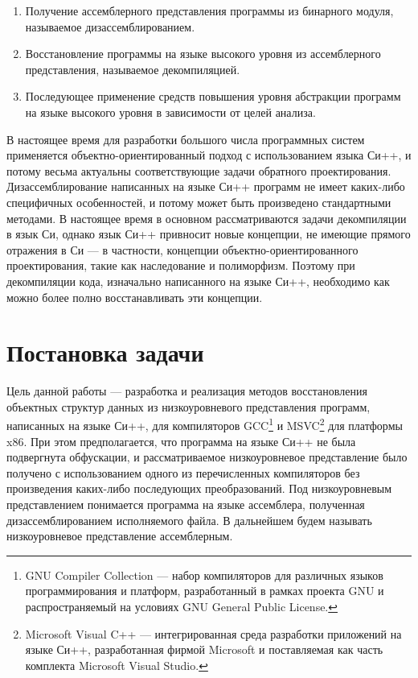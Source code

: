 \begin{enumerate}
\item Получение ассемблерного представления программы из бинарного модуля, называемое дизассемблированием.
\item Восстановление программы на языке высокого уровня из ассемблерного представления, называемое декомпиляцией.
\item Последующее применение средств повышения уровня абстракции программ на языке высокого уровня в зависимости от целей анализа.
\end{enumerate}

В настоящее время для разработки большого числа программных систем применяется объектно-ориентированный подход с использованием языка Си++, и потому весьма актуальны соответствующие задачи обратного проектирования. Дизассемблирование написанных на языке Си++ программ не имеет каких-либо специфичных особенностей, и потому может быть произведено стандартными методами. В настоящее время в основном рассматриваются задачи декомпиляции в язык Си, однако язык Си++ привносит новые концепции, не имеющие прямого отражения в Си --- в частности, концепции объектно-ориентированного проектирования, такие как наследование и полиморфизм. Поэтому при декомпиляции кода, изначально написанного на языке Си++, необходимо как можно более полно восстанавливать эти концепции.




\newpage
\section{Постановка задачи}\label{chapter:problem}
Цель данной работы --- разработка и реализация методов восстановления объектных структур данных из низкоуровневого представления программ, написанных на языке Си++, для компиляторов GCC\footnote{GNU Compiler Collection --- набор компиляторов для различных языков программирования и платформ, разработанный в рамках проекта GNU и распространяемый на условиях GNU General Public License.} и MSVC\footnote{Microsoft Visual C++ --- интегрированная среда разработки приложений на языке Си++, разработанная фирмой Microsoft и поставляемая как часть комплекта Microsoft Visual Studio.} для платформы x86. При этом предполагается, что программа на языке Си++ не была подвергнута обфускации, и рассматриваемое низкоуровневое представление было получено с использованием одного из перечисленных компиляторов без произведения каких-либо последующих преобразований. Под низкоуровневым представлением понимается программа на языке ассемблера, полученная дизассемблированием исполняемого файла. В дальнейшем будем называть низкоуровневое представление ассемблерным.

